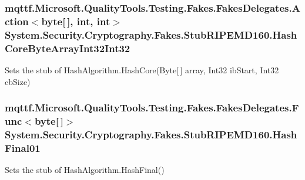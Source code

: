\hypertarget{class_system_1_1_security_1_1_cryptography_1_1_fakes_1_1_stub_r_i_p_e_m_d160_aef9dcdab2a4f758d3c2e56e444bc7367}{
\subsubsection[{Hash\-Core\-Byte\-Array\-Int32\-Int32}]{\setlength{\rightskip}{0pt plus 5cm}mqttf.\-Microsoft.\-Quality\-Tools.\-Testing.\-Fakes.\-Fakes\-Delegates.\-Action$<$byte\mbox{[}$\,$\mbox{]}, int, int$>$ System.\-Security.\-Cryptography.\-Fakes.\-Stub\-R\-I\-P\-E\-M\-D160.\-Hash\-Core\-Byte\-Array\-Int32\-Int32}}\label{class_system_1_1_security_1_1_cryptography_1_1_fakes_1_1_stub_r_i_p_e_m_d160_aef9dcdab2a4f758d3c2e56e444bc7367}


Sets the stub of Hash\-Algorithm.\-Hash\-Core(\-Byte\mbox{[}$\,$\mbox{]} array, Int32 ib\-Start, Int32 cb\-Size)

\hypertarget{class_system_1_1_security_1_1_cryptography_1_1_fakes_1_1_stub_r_i_p_e_m_d160_af3700ed8d4ad86a959b59f43da61c840}{
\subsubsection[{Hash\-Final01}]{\setlength{\rightskip}{0pt plus 5cm}mqttf.\-Microsoft.\-Quality\-Tools.\-Testing.\-Fakes.\-Fakes\-Delegates.\-Func$<$byte\mbox{[}$\,$\mbox{]}$>$ System.\-Security.\-Cryptography.\-Fakes.\-Stub\-R\-I\-P\-E\-M\-D160.\-Hash\-Final01}}\label{class_system_1_1_security_1_1_cryptography_1_1_fakes_1_1_stub_r_i_p_e_m_d160_af3700ed8d4ad86a959b59f43da61c840}


Sets the stub of Hash\-Algorithm.\-Hash\-Final()

